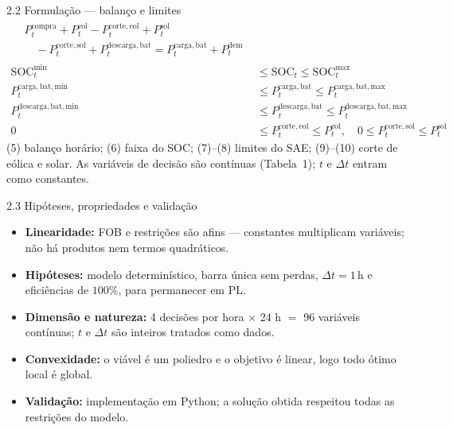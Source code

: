 \documentclass[aspectratio=169,11pt]{beamer}
\begin{document}
\begin{frame}{2.2 Formulação --- balanço e limites}
{\small
\begin{align}
\begin{aligned}
&P_t^{\mathrm{compra}}+P_t^{\mathrm{eol}}-P_t^{\mathrm{corte,eol}}+P_t^{\mathrm{sol}}\\
&\quad-P_t^{\mathrm{corte,sol}}+P_t^{\mathrm{descarga,bat}}
= P_t^{\mathrm{carga,bat}}+P_t^{\mathrm{dem}}
\end{aligned}
\tag{5}\\[0.15em]
\mathrm{SOC}_t^{\min} &\le \mathrm{SOC}_t \le \mathrm{SOC}_t^{\max}
\tag{6}\\
P_t^{\mathrm{carga,bat,min}} &\le P_t^{\mathrm{carga,bat}} \le P_t^{\mathrm{carga,bat,max}}
\tag{7}\\
P_t^{\mathrm{descarga,bat,min}} &\le P_t^{\mathrm{descarga,bat}} \le P_t^{\mathrm{descarga,bat,max}}
\tag{8}\\
0 &\le P_t^{\mathrm{corte,eol}} \le P_t^{\mathrm{eol}},
\quad
0 \le P_t^{\mathrm{corte,sol}} \le P_t^{\mathrm{sol}}
\tag{9,10}
\end{align}
}
\vspace{-0.35em}
{\small (5) balanço horário; (6) faixa do SOC; (7)--(8) limites do SAE; (9)--(10) corte de eólica e solar.
As variáveis de decisão são contínuas (Tabela~1); $t$ e $\Delta t$ entram como constantes.}
\end{frame}

\begin{frame}{2.3 Hipóteses, propriedades e validação}
\begin{itemize}\setlength{\itemsep}{0.4em}
  \item \textbf{Linearidade:} FOB e restrições são afins --- constantes multiplicam variáveis; não há produtos nem termos quadráticos.
  \item \textbf{Hipóteses:} modelo determinístico, barra única sem perdas, $\Delta t=1\,\mathrm{h}$ e eficiências de $100\%$, para permanecer em PL.
  \item \textbf{Dimensão e natureza:} 4 decisões por hora $\times$ 24 h $=$ 96 variáveis contínuas; $t$ e $\Delta t$ são inteiros tratados como dados.
  \item \textbf{Convexidade:} o viável é um poliedro e o objetivo é linear, logo todo ótimo local é global.
  \item \textbf{Validação:} implementação em Python; a solução obtida respeitou todas as restrições do modelo.
\end{itemize}
\end{frame}
\end{document}

